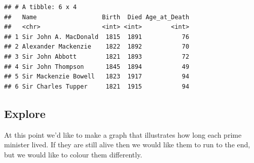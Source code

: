 \documentclass[
]{book}
\newenvironment{Shaded}{\begin{snugshade}}{\end{snugshade}}
\newcommand{\DataTypeTok}[1]{\textcolor[rgb]{0.13,0.29,0.53}{#1}}
\newcommand{\DecValTok}[1]{\textcolor[rgb]{0.00,0.00,0.81}{#1}}
\newcommand{\KeywordTok}[1]{\textcolor[rgb]{0.13,0.29,0.53}{\textbf{#1}}}
\newcommand{\NormalTok}[1]{#1}
\newcommand{\OperatorTok}[1]{\textcolor[rgb]{0.81,0.36,0.00}{\textbf{#1}}}
\newcommand{\StringTok}[1]{\textcolor[rgb]{0.31,0.60,0.02}{#1}}
\begin{document}
\begin{verbatim}
## # A tibble: 6 x 4
##   Name                  Birth  Died Age_at_Death
##   <chr>                 <int> <int>        <int>
## 1 Sir John A. MacDonald  1815  1891           76
## 2 Alexander Mackenzie    1822  1892           70
## 3 Sir John Abbott        1821  1893           72
## 4 Sir John Thompson      1845  1894           49
## 5 Sir Mackenzie Bowell   1823  1917           94
## 6 Sir Charles Tupper     1821  1915           94
\end{verbatim}

\hypertarget{explore-1}{%
\subsection{Explore}\label{explore-1}}

At this point we'd like to make a graph that illustrates how long each prime minister lived. If they are still alive then we would like them to run to the end, but we would like to colour them differently.

\begin{Shaded}
\end{Shaded}
\end{document}
